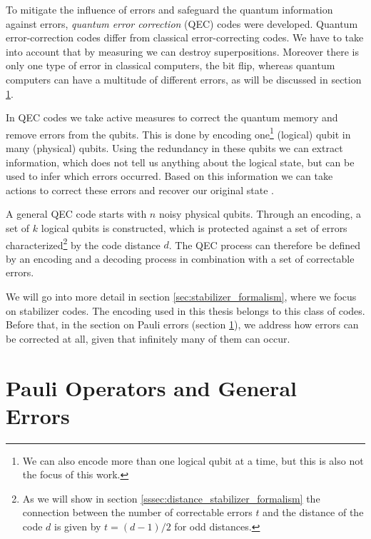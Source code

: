 To mitigate the influence of errors and safeguard the quantum information against errors, \emph{quantum error correction} (QEC) codes were developed. %
Quantum error-correction codes differ from classical error-correcting codes. 
We have to take into account that by measuring we can destroy superpositions.
Moreover there is only one type of error in classical computers, the bit flip, whereas quantum computers can have a multitude of different errors, as will be discussed in section \ref{sec:pauli_errors}.

In QEC codes we take active measures to correct the quantum memory and remove errors from the qubits. 
This is done by encoding one\footnote{We can also encode more than one logical qubit at a time, but this is also not the focus of this work.} (logical) qubit in many (physical) qubits. 
Using the redundancy in these qubits we can extract information, which does not tell us anything about the logical state, but can be used to infer which errors occurred.
Based on this information we can take actions to correct these errors and recover our original state \cite{terhal_qec_formalism}.

A general QEC code starts with $n$ noisy physical qubits.
Through an encoding, a set of $k$ logical qubits is constructed, which is protected against a set of errors characterized\footnote{
    As we will show in section \ref{sssec:distance_stabilizer_formalism} the connection between the number of correctable errors $t$ and the distance of the code $d$ is given by $t=(d-1)/2$ for odd distances. 
} by the code distance $d$.
The QEC process can therefore be defined by an encoding and a decoding process in combination with a set of correctable errors.

We will go into more detail in section \ref{sec:stabilizer_formalism}, where we focus on stabilizer codes. 
The encoding used in this thesis belongs to this class of codes.
Before that, in the section on Pauli errors (section \ref{sec:pauli_errors}), we
address how errors can be corrected at all, given that infinitely many of them can occur.


\section{Pauli Operators and General Errors}\label{sec:pauli_errors}

